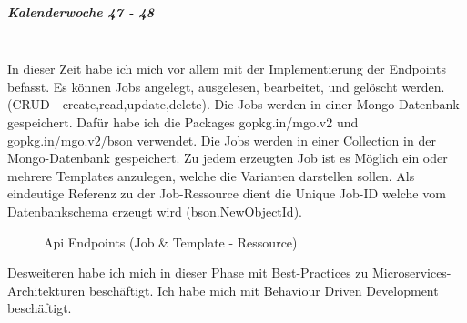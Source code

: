 \documentclass[12pt]{article}
\begin{document}
\newpage
\subparagraph{Kalenderwoche 47 - 48}\mbox{}\\

In dieser Zeit habe ich mich vor allem mit der Implementierung der Endpoints befasst. Es können Jobs angelegt, ausgelesen, bearbeitet, und gelöscht werden. (CRUD - create,read,update,delete). Die Jobs werden in einer Mongo-Datenbank gespeichert. Dafür habe ich die Packages gopkg.in/mgo.v2 und gopkg.in/mgo.v2/bson verwendet. Die Jobs werden in einer Collection in der Mongo-Datenbank gespeichert. Zu jedem erzeugten Job ist es Möglich ein oder mehrere Templates anzulegen, welche die Varianten darstellen sollen. Als eindeutige Referenz zu der Job-Ressource dient die Unique Job-ID welche vom Datenbankschema erzeugt wird (bson.NewObjectId).

\begin{figure}[h!]
\caption{Api Endpoints (Job \& Template - Ressource)}
\label{tab:meinetabelle}
\end{figure}

Desweiteren habe ich mich in dieser Phase mit Best-Practices zu Microservices-Architekturen beschäftigt. Ich habe mich mit Behaviour Driven Development beschäftigt.
\end{document}
